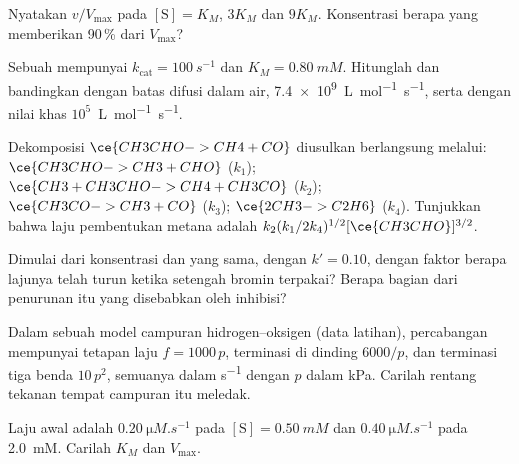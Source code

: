\begin{exercise}[$\star$]\label{exo:b3:complex-kinetics:3}
Nyatakan $v/V_{\max}$ pada $[\mathrm S] = K_M$, $3K_M$ dan $9K_M$. Konsentrasi
berapa yang memberikan 90\,\% dari $V_{\max}$?
\end{exercise}

\begin{exercise}[$\star$]\label{exo:b3:complex-kinetics:4}
Sebuah  mempunyai $k_{\mathrm{cat}} = \qty{100}{s^{-1}}$ dan $K_M = \qty{0.80}{mM}$.
Hitunglah  dan bandingkan dengan batas difusi dalam
air, \qty{7.4e9}{L.mol^{-1}.s^{-1}}, serta dengan nilai khas
$10^5$~\unit{L.mol^{-1}.s^{-1}}.
\end{exercise}

\begin{exercise}[$\star\star$]\label{exo:b3:complex-kinetics:5}
Dekomposisi $\ce{CH3CHO -> CH4 + CO}$ diusulkan berlangsung melalui: $\ce{CH3CHO -> CH3 +
CHO}$ ($k_1$); $\ce{CH3 + CH3CHO -> CH4 + CH3CO}$ ($k_2$); $\ce{CH3CO -> CH3 + CO}$ ($k_3$);
$\ce{2 CH3 -> C2H6}$ ($k_4$). Tunjukkan bahwa laju pembentukan metana adalah
$k_2(k_1/2k_4)^{1/2}[\ce{CH3CHO}]^{3/2}$.
\end{exercise}

\begin{exercise}[$\star\star$]\label{exo:b3:complex-kinetics:6}
Dimulai dari konsentrasi  dan  yang sama, dengan $k' = 0.10$,
dengan faktor berapa lajunya telah turun ketika setengah bromin terpakai?
Berapa bagian dari penurunan itu yang disebabkan oleh inhibisi?
\end{exercise}

\begin{exercise}[$\star\star$]\label{exo:b3:complex-kinetics:7}
Dalam sebuah model campuran hidrogen--oksigen (data latihan), percabangan
mempunyai tetapan laju $f = 1000\,p$, terminasi di dinding $6000/p$, dan
terminasi tiga benda $10\,p^2$, semuanya dalam \unit{s^{-1}} dengan $p$ dalam kPa.
Carilah rentang tekanan tempat campuran itu meledak.
\end{exercise}

\begin{exercise}[$\star\star$]\label{exo:b3:complex-kinetics:8}
Laju awal adalah $\qty{0.20}{\micro M.s^{-1}}$ pada $[\mathrm S] = \qty{0.50}{mM}$ dan
$\qty{0.40}{\micro M.s^{-1}}$ pada \qty{2.0}{mM}. Carilah $K_M$ dan $V_{\max}$.
\end{exercise}

